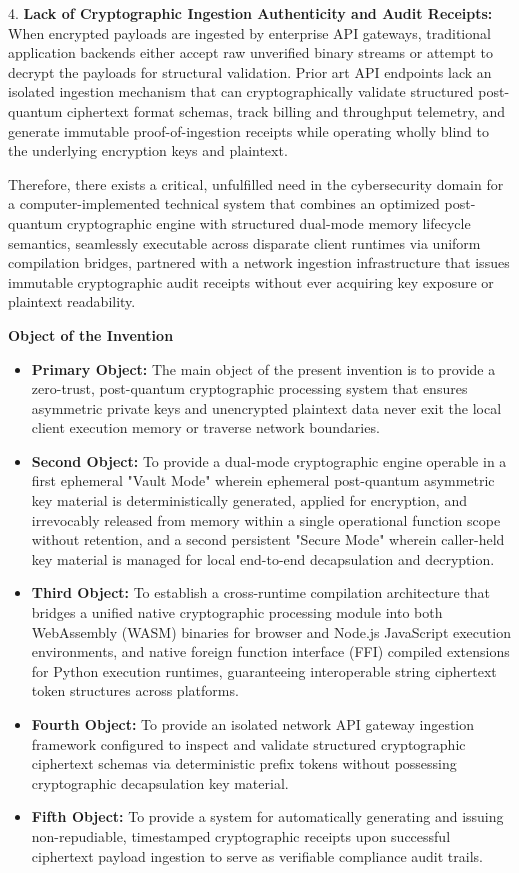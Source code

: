 \documentclass[12pt, a4paper]{article}
\begin{document}
4. \textbf{Lack of Cryptographic Ingestion Authenticity and Audit Receipts:} When encrypted payloads are ingested by enterprise API gateways, traditional application backends either accept raw unverified binary streams or attempt to decrypt the payloads for structural validation. Prior art API endpoints lack an isolated ingestion mechanism that can cryptographically validate structured post-quantum ciphertext format schemas, track billing and throughput telemetry, and generate immutable proof-of-ingestion receipts while operating wholly blind to the underlying encryption keys and plaintext.

Therefore, there exists a critical, unfulfilled need in the cybersecurity domain for a computer-implemented technical system that combines an optimized post-quantum cryptographic engine with structured dual-mode memory lifecycle semantics, seamlessly executable across disparate client runtimes via uniform compilation bridges, partnered with a network ingestion infrastructure that issues immutable cryptographic audit receipts without ever acquiring key exposure or plaintext readability.

\vspace{1em}
\noindent \textbf{Object of the Invention}
\begin{itemize}
    \item \textbf{Primary Object:} The main object of the present invention is to provide a zero-trust, post-quantum cryptographic processing system that ensures asymmetric private keys and unencrypted plaintext data never exit the local client execution memory or traverse network boundaries.
    \item \textbf{Second Object:} To provide a dual-mode cryptographic engine operable in a first ephemeral "Vault Mode" wherein ephemeral post-quantum asymmetric key material is deterministically generated, applied for encryption, and irrevocably released from memory within a single operational function scope without retention, and a second persistent "Secure Mode" wherein caller-held key material is managed for local end-to-end decapsulation and decryption.
    \item \textbf{Third Object:} To establish a cross-runtime compilation architecture that bridges a unified native cryptographic processing module into both WebAssembly (WASM) binaries for browser and Node.js JavaScript execution environments, and native foreign function interface (FFI) compiled extensions for Python execution runtimes, guaranteeing interoperable string ciphertext token structures across platforms.
    \item \textbf{Fourth Object:} To provide an isolated network API gateway ingestion framework configured to inspect and validate structured cryptographic ciphertext schemas via deterministic prefix tokens without possessing cryptographic decapsulation key material.
    \item \textbf{Fifth Object:} To provide a system for automatically generating and issuing non-repudiable, timestamped cryptographic receipts upon successful ciphertext payload ingestion to serve as verifiable compliance audit trails.
\end{itemize}
\end{document}
